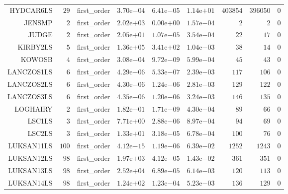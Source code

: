 \begin{longtable}{rrrrrrrrr}
HYDCAR6LS & \(    29\) & first\_order & \( 3.70\)e\(-04\) & \( 6.41\)e\(-05\) & \( 1.14\)e\(+01\) & \(403854\) & \(396050\) & \(     0\) \\
JENSMP & \(     2\) & first\_order & \( 2.02\)e\(+03\) & \( 0.00\)e\(+00\) & \( 1.57\)e\(-04\) & \(     2\) & \(     2\) & \(     0\) \\
JUDGE & \(     2\) & first\_order & \( 2.05\)e\(+01\) & \( 1.07\)e\(-05\) & \( 3.54\)e\(-04\) & \(    22\) & \(    17\) & \(     0\) \\
KIRBY2LS & \(     5\) & first\_order & \( 1.36\)e\(+05\) & \( 3.41\)e\(+02\) & \( 1.04\)e\(-03\) & \(    38\) & \(    14\) & \(     0\) \\
KOWOSB & \(     4\) & first\_order & \( 3.08\)e\(-04\) & \( 9.72\)e\(-09\) & \( 5.99\)e\(-04\) & \(    45\) & \(    43\) & \(     0\) \\
LANCZOS1LS & \(     6\) & first\_order & \( 4.29\)e\(-06\) & \( 5.33\)e\(-07\) & \( 2.39\)e\(-03\) & \(   117\) & \(   106\) & \(     0\) \\
LANCZOS2LS & \(     6\) & first\_order & \( 4.30\)e\(-06\) & \( 1.24\)e\(-06\) & \( 2.81\)e\(-03\) & \(   129\) & \(   122\) & \(     0\) \\
LANCZOS3LS & \(     6\) & first\_order & \( 4.35\)e\(-06\) & \( 1.20\)e\(-06\) & \( 3.24\)e\(-03\) & \(   146\) & \(   135\) & \(     0\) \\
LOGHAIRY & \(     2\) & first\_order & \( 1.82\)e\(-01\) & \( 1.71\)e\(-09\) & \( 4.30\)e\(-04\) & \(    89\) & \(    66\) & \(     0\) \\
LSC1LS & \(     3\) & first\_order & \( 7.71\)e\(+00\) & \( 2.88\)e\(-06\) & \( 8.97\)e\(-04\) & \(    94\) & \(    69\) & \(     0\) \\
LSC2LS & \(     3\) & first\_order & \( 1.33\)e\(+01\) & \( 3.18\)e\(-05\) & \( 6.78\)e\(-04\) & \(   100\) & \(    76\) & \(     0\) \\
LUKSAN11LS & \(   100\) & first\_order & \( 4.12\)e\(-15\) & \( 1.19\)e\(-06\) & \( 6.39\)e\(-02\) & \(  1252\) & \(  1243\) & \(     0\) \\
LUKSAN12LS & \(    98\) & first\_order & \( 1.97\)e\(+03\) & \( 4.12\)e\(-05\) & \( 1.43\)e\(-02\) & \(   361\) & \(   351\) & \(     0\) \\
LUKSAN13LS & \(    98\) & first\_order & \( 2.52\)e\(+04\) & \( 6.89\)e\(-05\) & \( 6.14\)e\(-03\) & \(   120\) & \(   113\) & \(     0\) \\
LUKSAN14LS & \(    98\) & first\_order & \( 1.24\)e\(+02\) & \( 1.23\)e\(-04\) & \( 5.23\)e\(-03\) & \(   136\) & \(   129\) & \(     0\) \\

\end{longtable}
